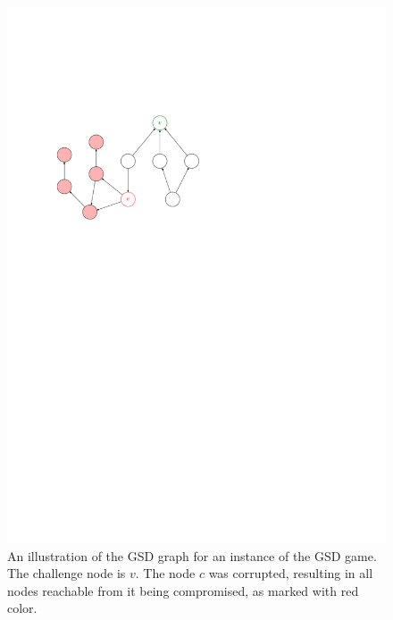 \begin{figure}
	\begin{center}
		\includegraphics{figures/gsd-example}
	\end{center}
	\caption{An illustration of the GSD graph for an instance of the GSD game. The challenge node is $v$. The node $c$ was corrupted, resulting in all nodes reachable from it being compromised, as marked with red color.} \label{fig:gsd-example}
\end{figure}

